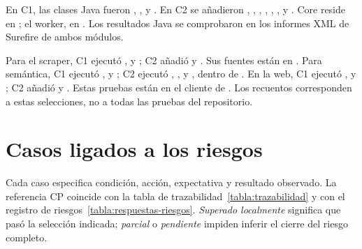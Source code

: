 En C1, las clases Java fueron , ,  y . En C2 se añadieron , , , , , ,  y . Core reside en ; el worker, en . Los resultados Java se comprobaron en los informes XML de Surefire de ambos módulos.

Para el scraper, C1 ejecutó ,  y ; C2 añadió  y . Sus fuentes están en . Para semántica, C1 ejecutó ,  y ; C2 ejecutó , ,  y , dentro de . En la web, C1 ejecutó ,  y ; C2 añadió  y . Estas pruebas están en el cliente de . Los recuentos corresponden a estas selecciones, no a todas las pruebas del repositorio.

\section{Casos ligados a los riesgos}

Cada caso especifica condición, acción, expectativa y resultado observado. La referencia CP coincide con la tabla de trazabilidad~\ref{tabla:trazabilidad} y con el registro de riesgos~\ref{tabla:respuestas-riesgos}. \emph{Superado localmente} significa que pasó la selección indicada; \emph{parcial} o \emph{pendiente} impiden inferir el cierre del riesgo completo.

